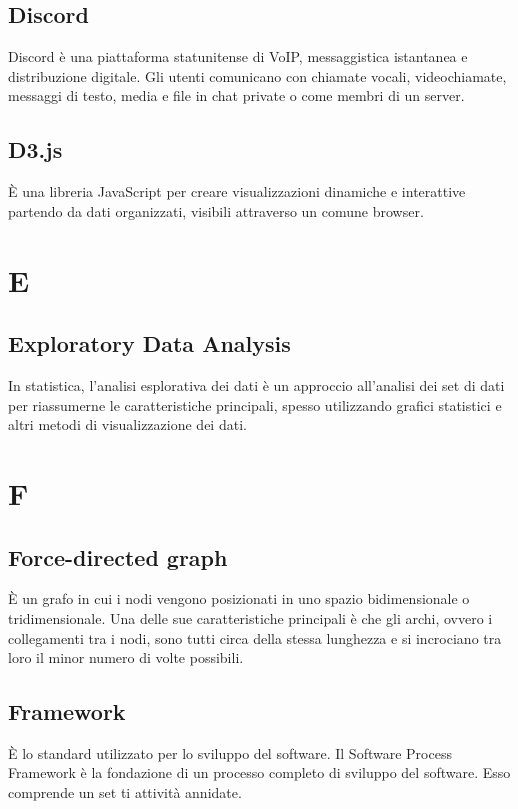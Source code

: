 \subsection{Discord}
Discord è una piattaforma statunitense di VoIP, messaggistica istantanea e distribuzione digitale. Gli utenti comunicano con chiamate vocali, videochiamate, messaggi di testo, media e file in chat private o come membri di un server.

\subsection{D3.js}
\`E una libreria JavaScript per creare visualizzazioni dinamiche e interattive partendo da dati organizzati, visibili attraverso un comune browser.



\newpage
\section{E}
\subsection{Exploratory Data Analysis}
In statistica, l'analisi esplorativa dei dati è un approccio all'analisi dei set di dati per riassumerne le caratteristiche principali, spesso utilizzando grafici statistici e altri metodi di visualizzazione dei dati.

\newpage
\section{F}
\subsection{Force-directed graph}
È un grafo in cui i nodi vengono posizionati in uno spazio bidimensionale o tridimensionale. Una delle sue caratteristiche principali è che gli archi, ovvero i collegamenti tra i nodi, sono tutti circa della stessa lunghezza e si incrociano tra loro il minor numero di volte possibili.

\subsection{Framework}
È lo standard utilizzato per lo sviluppo del software. Il Software Process Framework è la fondazione di un processo completo di sviluppo
del software. Esso comprende un set ti attività annidate.

